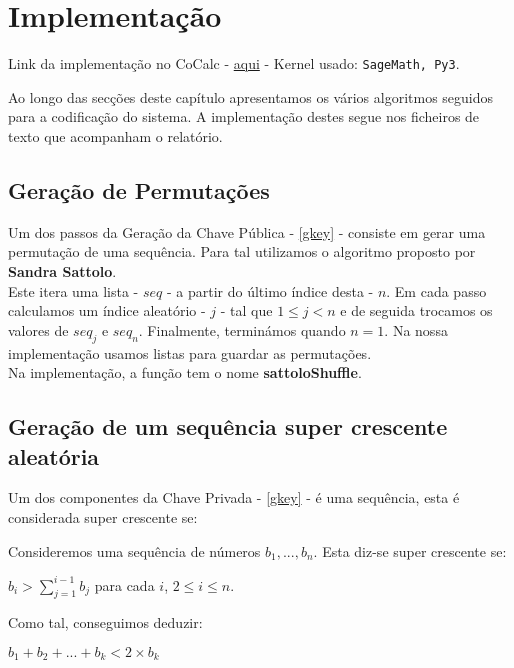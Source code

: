 \documentclass[11pt, language=portuguese]{report}
\begin{document}
\chapter{Implementação}

Link da implementação no CoCalc - \href{https://cocalc.com/share/1bede121-9d2a-477f-be2c-1dea8a3a05a6/Merkle-Hellman%20knapsack.ipynb?viewer=share}{aqui} - Kernel usado: \texttt{SageMath, Py3}.

Ao longo das secções deste capítulo apresentamos os vários algoritmos seguidos para a codificação do sistema.
A implementação destes segue nos ficheiros de texto que acompanham o relatório.

\section{Geração de Permutações}
\label{perm}

Um dos passos da Geração da Chave Pública - \ref{gkey} - consiste em gerar uma permutação de uma sequência. Para tal utilizamos o algoritmo proposto por \textbf{Sandra Sattolo}\autocite{sattolo}.\\
Este itera uma lista - $seq$ - a partir do último índice desta - $n$. Em cada passo calculamos um índice aleatório - $j$ - tal que $1 \le j < n$ e de seguida trocamos os valores de $seq_j$ e $seq_n$. Finalmente, terminámos quando $n = 1$. Na nossa implementação usamos listas para guardar as permutações.\\
Na implementação, a função tem o nome \textbf{sattoloShuffle}.

\section{Geração de um sequência super crescente aleatória}
\label{seq}

Um dos componentes da Chave Privada - \ref{gkey} - é uma sequência, esta é considerada super crescente se:\\
\begin{definition}
	Consideremos uma sequência de números ${b_1, ..., b_n}$. Esta diz-se super crescente se:
	\begin{center}
		$b_i > \sum_{j = 1}^{i - 1} b_j$ para cada $i$, $2 \le i \le n$.
	\end{center}
\end{definition}

Como tal, conseguimos deduzir:

\begin{center}
	$b_1 + b_2 + ... + b_k < 2 \times b_k$
\end{center}
\end{document}
